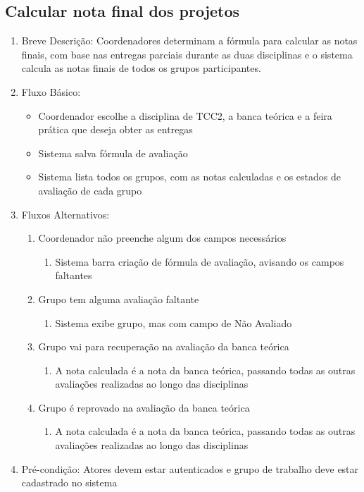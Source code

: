 \subsection{Calcular nota final dos projetos}
\begin{enumerate}
    \item Breve Descrição: Coordenadores determinam a fórmula para calcular as notas finais, com base nas entregas parciais durante as duas disciplinas e o sistema calcula as notas finais de todos os grupos participantes.
    \item Fluxo Básico:
    \begin{itemize}
        \item Coordenador escolhe a disciplina de TCC2, a banca teórica e a feira prática que deseja obter as entregas
        \item Sistema salva fórmula de avaliação
        \item Sistema lista todos os grupos, com as notas calculadas e os estados de avaliação de cada grupo
    \end{itemize}
    \item Fluxos Alternativos:
    \begin{enumerate}
        \item Coordenador não preenche algum dos campos necessários
        \begin{enumerate}
            \item Sistema barra criação de fórmula de avaliação, avisando os campos faltantes
        \end{enumerate}
        \item Grupo tem alguma avaliação faltante
        \begin{enumerate}
            \item Sistema exibe grupo, mas com campo de Não Avaliado
        \end{enumerate}
        \item Grupo vai para recuperação na avaliação da banca teórica
        \begin{enumerate}
            \item A nota calculada é a nota da banca teórica, passando todas as outras avaliações realizadas ao longo das disciplinas
        \end{enumerate}
        \item Grupo é reprovado na avaliação da banca teórica
        \begin{enumerate}
            \item A nota calculada é a nota da banca teórica, passando todas as outras avaliações realizadas ao longo das disciplinas
        \end{enumerate}
    \end{enumerate}
    \item Pré-condição: Atores devem estar autenticados e grupo de trabalho deve estar cadastrado no sistema
\end{enumerate}

